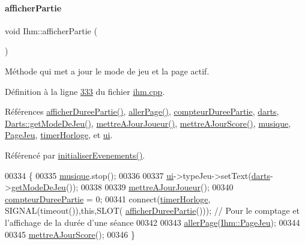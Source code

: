 \paragraph{\texorpdfstring{afficher\+Partie}{afficherPartie}}
{\footnotesize\ttfamily void Ihm\+::afficher\+Partie (\begin{DoxyParamCaption}{ }\end{DoxyParamCaption})\hspace{0.3cm}{\ttfamily [slot]}}



Méthode qui met a jour le mode de jeu et la page actif. 



Définition à la ligne \hyperlink{ihm_8cpp_source_l00333}{333} du fichier \hyperlink{ihm_8cpp_source}{ihm.\+cpp}.



Références \hyperlink{ihm_8cpp_source_l00484}{afficher\+Duree\+Partie()}, \hyperlink{ihm_8cpp_source_l00429}{aller\+Page()}, \hyperlink{ihm_8h_source_l00058}{compteur\+Duree\+Partie}, \hyperlink{ihm_8h_source_l00055}{darts}, \hyperlink{darts_8cpp_source_l00099}{Darts\+::get\+Mode\+De\+Jeu()}, \hyperlink{ihm_8cpp_source_l00242}{mettre\+A\+Jour\+Joueur()}, \hyperlink{ihm_8cpp_source_l00141}{mettre\+A\+Jour\+Score()}, \hyperlink{ihm_8h_source_l00056}{musique}, \hyperlink{ihm_8h_source_l00076}{Page\+Jeu}, \hyperlink{ihm_8h_source_l00053}{timer\+Horloge}, et \hyperlink{ihm_8h_source_l00052}{ui}.



Référencé par \hyperlink{ihm_8cpp_source_l00075}{initialiser\+Evenements()}.


\begin{DoxyCode}
00334 \{
00335     \hyperlink{class_ihm_a6e2a173ec36ee846d6210117b4b85fa8}{musique}.stop();
00336 
00337     \hyperlink{class_ihm_a0ac5f47856566ceeeca1720109bf70ea}{ui}->typeJeu->setText(\hyperlink{class_ihm_a2a0f54d33f4d6b2531ec2190c4a2356e}{darts}->\hyperlink{class_darts_a49ea4ca23fd03d80f5a95257c6fe8478}{getModeDeJeu}());
00338 
00339     \hyperlink{class_ihm_aaeeb08a39f940e58da194768763dc00b}{mettreAJourJoueur}();
00340     \hyperlink{class_ihm_a61e4a83f8ca0f177971af808e51be5bb}{compteurDureePartie} = 0;
00341     connect(\hyperlink{class_ihm_a21ea35b212966fa2805241ea6237d351}{timerHorloge}, SIGNAL(timeout()),\textcolor{keyword}{this},SLOT(
      \hyperlink{class_ihm_a808bd550b877499a38419a492595822e}{afficherDureePartie}())); \textcolor{comment}{// Pour le comptage et l'affichage de la durée d'une séance}
00342 
00343     \hyperlink{class_ihm_a52bf0bd258d00a16d3e1037a9288948b}{allerPage}(\hyperlink{class_ihm_a472c7a7bec7e6e0230842f78ace4833eadc27359267c694f4d9c3afc23fe8b82f}{Ihm::PageJeu});
00344 
00345     \hyperlink{class_ihm_a238255f517506367fe8913b2dad50c65}{mettreAJourScore}();
00346 \}
\end{DoxyCode}
\mbox{\label{class_ihm_a066192d0a1b9c241a67032b0c3c96be6}} 
